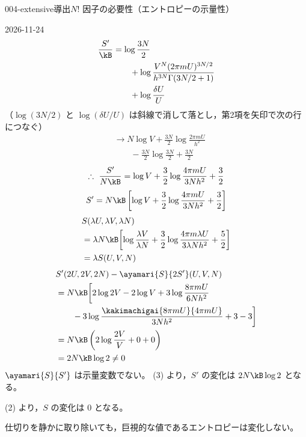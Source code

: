\documentclass[uplatex,dvipdfmx,a4paper,11pt]{jsarticle}
\begin{document}
\begin{mondai}{004-extensive}{導出}{$N!$ 因子の必要性（エントロピーの示量性）}
\begin{kotaeutsushi}{2026-11-24}
\begin{align*}
\frac{S'}{\kB}&=\log\frac{3N}{2}\\
&\qquad+\log\frac{V^{N}(2\pi mU)^{3N/2}}{h^{3N}\Gamma(3N/2+1)}\\
&\qquad+\log\frac{\delta U}{U}
\end{align*}
（$\log(3N/2)$ と $\log(\delta U/U)$ は斜線で消して落とし，第2項を矢印で次の行につなぐ）
\begin{align*}
&\to N\log V+\frac{3N}{2}\log\frac{2\pi mU}{h^{2}}\\
&\qquad-\frac{3N}{2}\log\frac{3N}{2}+\frac{3N}{2}
\end{align*}
\[ \therefore\ \frac{S'}{N\kB}=\log V+\frac{3}{2}\log\frac{4\pi mU}{3Nh^{2}}+\frac{3}{2} \]
\[ S'=N\kB\left[\log V+\frac{3}{2}\log\frac{4\pi mU}{3Nh^{2}}+\frac{3}{2}\right] \]
\begin{align*}
&S(\lambda U,\lambda V,\lambda N)\\
&=\lambda N\kB\biggl[\log\frac{\lambda V}{\lambda N}+\frac{3}{2}\log\frac{4\pi m\lambda U}{3\lambda Nh^{2}}+\frac{5}{2}\biggr]\\
&=\lambda S(U,V,N)
\end{align*}
\begin{align*}
&S'(2U,2V,2N)-\ayamari{S}{2S'}(U,V,N)\\
&=N\kB\biggl[2\log2V-2\log V+3\log\frac{8\pi mU}{6Nh^{2}}\\
&\qquad-3\log\frac{\kakimachigai{8\pi mU}{4\pi mU}}{3Nh^{2}}+3-3\biggr]\\
&=N\kB\left(2\log\frac{2V}{V}+0+0\right)\\
&=2N\kB\log2\neq0
\end{align*}
$\ayamari{S}{S'}$ は示量変数でない。
(3) より，$S'$ の変化は $2N\kB\log2$ となる。

(2) より，$S$ の変化は $0$ となる。

仕切りを静かに取り除いても，巨視的な値であるエントロピーは変化しない。


\end{kotaeutsushi}
\end{mondai}
\end{document}
